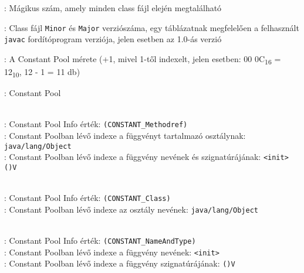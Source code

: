 \begin{compactitem}
\setlength\itemsep{-5px}
\item {}: Mágikus szám, amely minden class fájl elején megtalálható
\item {} : Class fájl \lstinline{Minor} és \lstinline{Major} verziószáma, egy táblázatnak megfelelően a felhasznált \lstinline{javac} fordítóprogram verziója, jelen esetben az 1.0-ás verzió
\item {}: A Constant Pool mérete (+1, mivel 1-től indexelt, jelen esetben: 00 0C\textsubscript{16} = 12\textsubscript{10}, 12 - 1 = 11 db)
\item {}: Constant Pool
\begin{compactitem}
    \setlength\itemsep{-5px}
    \item {}   \\
    : Constant Pool Info érték: \lstinline{(CONSTANT_Methodref)} \\
    : Constant Poolban lévő indexe a függvényt tartalmazó osztálynak: \lstinline{java/lang/Object} \\
    : Constant Poolban lévő indexe a függvény nevének és szignatúrájának: \lstinline{<init> ()V}
    \item {}  \\
    : Constant Pool Info érték: \lstinline{(CONSTANT_Class)} \\
    : Constant Poolban lévő indexe az osztály nevének: \lstinline{java/lang/Object}
    \item {}   \\
    : Constant Pool Info érték: \lstinline{(CONSTANT_NameAndType)} \\
    : Constant Poolban lévő indexe a függvény nevének: \lstinline{<init>} \\
    : Constant Poolban lévő indexe a függvény szignatúrájának: \lstinline{()V}
	\item {}   \\

\end{compactitem}
\end{compactitem}

